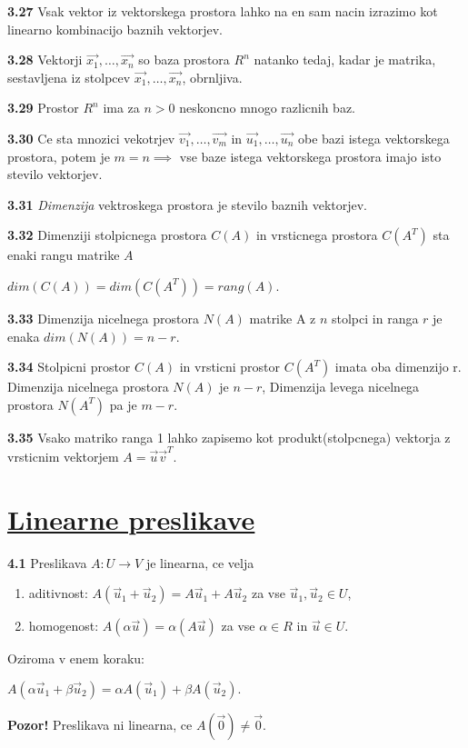 \documentclass{article}
\begin{document}
\begin{multicols}{4}
	\textbf{3.27} Vsak vektor iz vektorskega prostora lahko na en sam nacin izrazimo
	kot linearno kombinacijo baznih vektorjev.

	\textbf{3.28} Vektorji $\vec{x_{1}}, \dots,\vec{x_{n}}$ so baza prostora $R^{n}$ natanko tedaj, kadar
	je matrika, sestavljena iz stolpcev $\vec{x_{1}}, \dots,\vec{x_{n}}$, obrnljiva.

	\textbf{3.29} Prostor $R^{n}$ ima za $n > 0$ neskoncno mnogo razlicnih baz.

	\textbf{3.30} Ce sta mnozici vekotrjev {$\vec{v_{1}}, \dots,\vec{v_{m}}$} in $\vec{u_{1}}, \dots,\vec{u_{n}}$
	obe bazi istega vektorskega prostora, potem je $m = n \implies$ vse baze istega vektorskega prostora imajo
	isto stevilo vektorjev.

	\textbf{3.31} \textit{Dimenzija} vektroskega prostora je stevilo baznih vektorjev.

	\textbf{3.32} Dimenziji stolpicnega prostora $C(A)$ in vrsticnega prostora $C(A^{T})$ sta enaki rangu matrike $A$
	\begin{center}
		$dim(C(A)) = dim(C(A^{T})) = rang(A)$.
	\end{center}

	\textbf{3.33} Dimenzija nicelnega prostora $N(A)$ matrike A z $n$ stolpci in ranga $r$
	je enaka $dim(N(A)) = n - r$.

	\textbf{3.34} Stolpicni prostor $C(A)$ in vrsticni prostor $C(A^{T})$ imata oba dimenzijo r. Dimenzija
	nicelnega prostora $N(A)$ je $n -r$, Dimenzija levega nicelnega prostora $N(A^{T})$ pa je $m - r$.

	\textbf{3.35} Vsako matriko ranga 1 lahko zapisemo kot produkt(stolpcnega) vektorja z vrsticnim
	vektorjem $A = \vec{u}\vec{v}^{T}$.

	\section{\underline{Linearne preslikave}}

	\textbf{4.1} Preslikava $A: U \rightarrow V$ je linearna, ce velja
	\begin{enumerate}
		\item aditivnost: $A(\vec{u}_{1} + \vec{u}_{2}) = A\vec{u}_{1} + A\vec{u}_{2}$ za vse $\vec{u}_{1}, \vec{u}_{2} \in U$,
		\item homogenost: $A(\alpha \vec{u}) = \alpha(A\vec{u})$ za vse $\alpha \in R$ in $\vec{u} \in U$.
	\end{enumerate}
	Oziroma v enem koraku:
	\begin{center}
		\begin{math}
			A(\alpha\vec{u}_{1} + \beta\vec{u}_{2}) = \alpha A(\vec{u}_{1}) + \beta A(\vec{u}_{2}).
		\end{math}
	\end{center}
	\textbf{Pozor!} Preslikava ni linearna, ce $A(\vec{0}) \neq  \vec{0}$.


\end{multicols}
\end{document}
